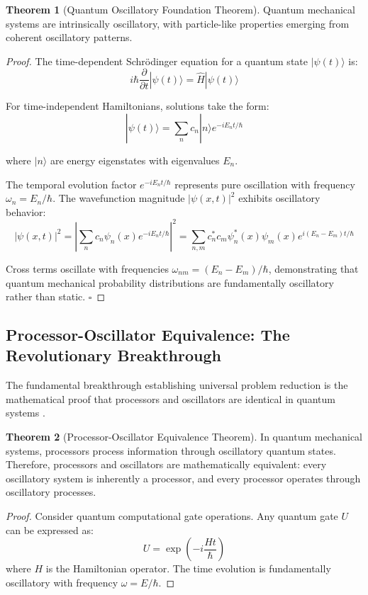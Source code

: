 \documentclass[12pt,a4paper]{article}
\theoremstyle{definition}
\newtheorem{theorem}{Theorem}[section]
\begin{document}
{\begin{theorem}[Quantum Oscillatory Foundation Theorem]
Quantum mechanical systems are intrinsically oscillatory, with particle-like properties emerging from coherent oscillatory patterns.
\end{theorem}

\begin{proof}
The time-dependent Schrödinger equation for a quantum state $|\psi(t)\rangle$ is:
$$i\hbar \frac{\partial}{\partial t}|\psi(t)\rangle = \hat{H}|\psi(t)\rangle$$

For time-independent Hamiltonians, solutions take the form:
$$|\psi(t)\rangle = \sum_n c_n |n\rangle e^{-iE_n t/\hbar}$$

where $|n\rangle$ are energy eigenstates with eigenvalues $E_n$.

The temporal evolution factor $e^{-iE_n t/\hbar}$ represents pure oscillation with frequency $\omega_n = E_n/\hbar$. The wavefunction magnitude $|\psi(x,t)|^2$ exhibits oscillatory behavior:
$$|\psi(x,t)|^2 = \left|\sum_n c_n \psi_n(x) e^{-iE_n t/\hbar}\right|^2 = \sum_{n,m} c_n^* c_m \psi_n^*(x) \psi_m(x) e^{i(E_n - E_m)t/\hbar}$$

Cross terms oscillate with frequencies $\omega_{nm} = (E_n - E_m)/\hbar$, demonstrating that quantum mechanical probability distributions are fundamentally oscillatory rather than static. $\square$
\end{proof}

\subsection{Processor-Oscillator Equivalence: The Revolutionary Breakthrough}

The fundamental breakthrough establishing universal problem reduction is the mathematical proof that processors and oscillators are identical in quantum systems \cite{sachikonye2024oscillatory}.

\begin{theorem}[Processor-Oscillator Equivalence Theorem]
In quantum mechanical systems, processors process information through oscillatory quantum states. Therefore, processors and oscillators are mathematically equivalent: every oscillatory system is inherently a processor, and every processor operates through oscillatory processes.
\end{theorem}

\begin{proof}
Consider quantum computational gate operations. Any quantum gate $U$ can be expressed as:
$$U = \exp\left(-i\frac{H t}{\hbar}\right)$$
where $H$ is the Hamiltonian operator. The time evolution is fundamentally oscillatory with frequency $\omega = E/\hbar$.


\end{proof}}
\end{document}
